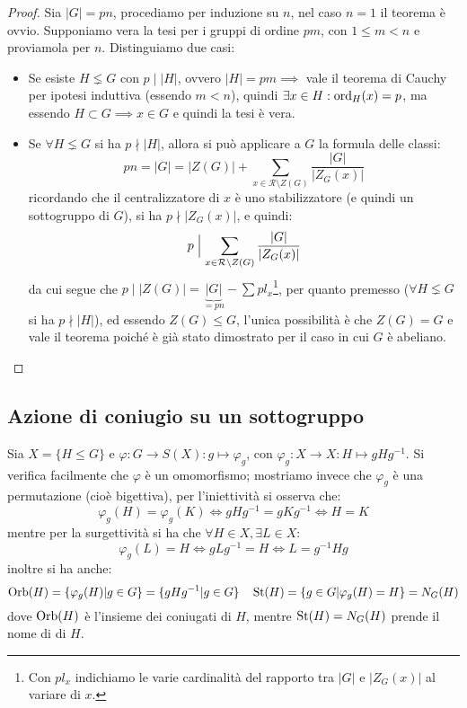 \documentclass[11pt]{scrartcl}
\begin{document}
\begin{proof}
    Sia $|G| = pn$, procediamo per induzione su $n$, nel caso $n = 1$ il teorema è ovvio. Supponiamo vera la tesi per i gruppi di ordine $pm$, con 
    $1 \leq m < n$ e proviamola per $n$. Distinguiamo due casi:
        \begin{itemize}
            \item Se esiste $H \lneq G$ con $p \mid |H|$, ovvero $|H| = pm \implies$ vale il teorema di Cauchy per ipotesi induttiva (essendo $m<n$), quindi 
            $\exists x \in H : \operatorname{ord}_H(x) = p$, ma essendo $H \subset G \implies x \in G$ e quindi la tesi è vera.
            \item Se $\forall H \lneq G$ si ha $p \nmid |H|$, allora si può applicare a $G$ la formula delle classi:
                \[ pn = |G| = |Z(G)| + \sum_{x \in \mathcal{R}\setminus{Z(G)}} \frac{|G|}{|Z_G(x)|}
                    \]
                ricordando che il centralizzatore di $x$ è uno stabilizzatore (e quindi un sottogruppo di $G$), si ha $p \nmid |Z_G(x)|$, e quindi:
                    \[ p \Bigm| \sum_{x \in \mathcal{R}\setminus{Z(G)}} \frac{|G|}{|Z_G(x)|}
                        \]
                da cui segue che $p \mid |Z(G)| = \underbrace{|G|}_{= pn} - \sum pl_x$\footnote{Con $pl_x$ indichiamo le varie cardinalità del rapporto tra $|G|$ e $|Z_G(x)|$ al variare di $x$.}, per quanto premesso ($\forall H \lneq G$ si ha $p \nmid |H|$), ed essendo $Z(G) \leqslant G$, l'unica 
                possibilità è che $Z(G) = G$ e vale il teorema poiché è già stato dimostrato per il caso in cui $G$ è abeliano.
        \end{itemize}
\end{proof}

\newpage
\subsection{Azione di coniugio su un sottogruppo}
Sia $X = \{H \leqslant G\}$ e $\varphi : G \longrightarrow S(X) : g \longmapsto \varphi_g$, con $\varphi_g : X \longrightarrow X : H \longmapsto gHg^{-1}$. 
    Si verifica facilmente che $\varphi$ è un omomorfismo; mostriamo invece che $\varphi_g$ è una permutazione (cioè bigettiva), per l'iniettività si osserva che:
        \[ \varphi_g(H) = \varphi_g(K) \iff gHg^{-1} = gKg^{-1} \iff H = K
            \]
    mentre per la surgettività si ha che $\forall H \in X, \exists L \in X$:
        \[ \varphi_g(L) = H \iff gLg^{-1} = H \iff L = g^{-1}Hg
            \]
    inoltre si ha anche:
        \[ \operatorname{Orb}(H) = \{\varphi_g(H) | g \in G\} = \{gHg^{-1}| g \in G\} \quad \operatorname{St}(H) = \{g \in G | \varphi_g(H) = H\} = N_G(H)
            \]
    dove $\operatorname{Orb}(H)$ è l'insieme dei coniugati di $H$, mentre $\operatorname{St}(H) = N_G(H)$ prende il nome di  di $H$.
\end{document}
